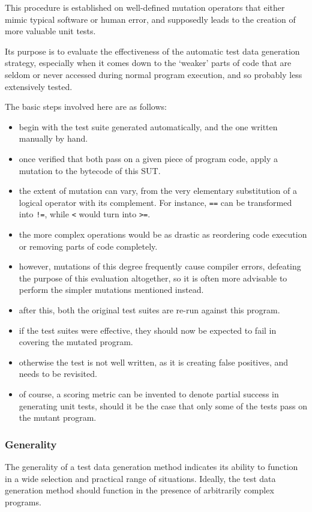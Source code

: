 \documentclass{icldt}
\numberwithin{equation}{section}       %
\begin{document}
{This procedure is established on well-defined mutation operators that either mimic typical software or human error, and supposedly leads to the creation of more valuable unit tests.

Its purpose is to evaluate the effectiveness of the automatic test data generation strategy, especially when it comes down to the `weaker' parts of code that are seldom or never accessed during normal program execution, and so probably less extensively tested.

The basic steps involved here are as follows:
\begin{itemize}
	\item begin with the test suite generated automatically, and the one written manually by hand.
	\item once verified that both pass on a given piece of program code, apply a mutation to the bytecode of this SUT.
	\item the extent of mutation can vary, from the very elementary substitution of a logical operator with its complement. For instance, \texttt{==} can be transformed into \texttt{!=}, while \texttt{<} would turn into \texttt{>=}.
	\item the more complex operations would be as drastic as reordering code execution or removing parts of code completely.
	\item however, mutations of this degree frequently cause compiler errors, defeating the purpose of this evaluation altogether, so it is often more advisable to perform the simpler mutations mentioned instead.
	\item after this, both the original test suites are re-run against this program.
	\item if the test suites were effective, they should now be expected to fail in covering the mutated program.
	\item otherwise the test is not well written, as it is creating false positives, and needs to be revisited.
	\item of course, a scoring metric can be invented to denote partial success in generating unit tests, should it be the case that only some of the tests pass on the mutant program.
\end{itemize}

\subsubsection{Generality}
The generality of a test data generation method indicates its ability to function in a wide selection and practical range of situations. Ideally, the test data generation method should function in the presence of arbitrarily complex programs.

}
\end{document}
